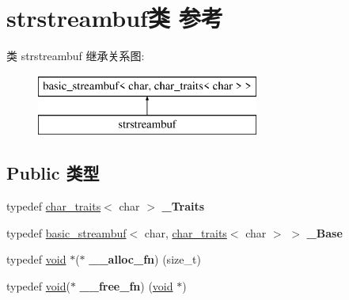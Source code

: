 \hypertarget{classstrstreambuf}{}\section{strstreambuf类 参考}
\label{classstrstreambuf}
类 strstreambuf 继承关系图\+:\begin{figure}[H]
\begin{center}
\leavevmode
\includegraphics[height=2.000000cm]{classstrstreambuf}
\end{center}
\end{figure}
\subsection*{Public 类型}
\begin{DoxyCompactItemize}
\item 
\mbox{\label{classstrstreambuf_a4017d32b331f560ef490d6c6d72fe8e7}} 
typedef \hyperlink{classchar__traits}{char\+\_\+traits}$<$ char $>$ {\bfseries \+\_\+\+Traits}
\item 
\mbox{\label{classstrstreambuf_ab7b32022b6c33862b28ef259f57e2523}} 
typedef \hyperlink{classbasic__streambuf}{basic\+\_\+streambuf}$<$ char, \hyperlink{classchar__traits}{char\+\_\+traits}$<$ char $>$ $>$ {\bfseries \+\_\+\+Base}
\item 
\mbox{\label{classstrstreambuf_a7e2ad1df0453c318b5543f2d47e06517}} 
typedef \hyperlink{interfacevoid}{void} $\ast$($\ast$ {\bfseries \+\_\+\+\_\+alloc\+\_\+fn}) (size\+\_\+t)
\item 
\mbox{\label{classstrstreambuf_a9c9562418d8e7933fbd2eb0f4c453245}} 
typedef \hyperlink{interfacevoid}{void}($\ast$ {\bfseries \+\_\+\+\_\+free\+\_\+fn}) (\hyperlink{interfacevoid}{void} $\ast$)
\end{DoxyCompactItemize}

